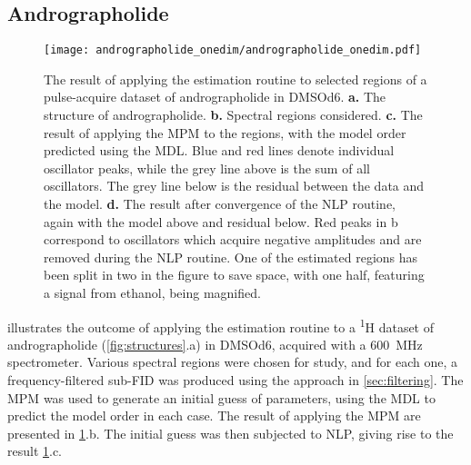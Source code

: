 \subsection{Andrographolide}
\label{subsec:andro}
\begin{figure}
    \centering
    \texttt{[image: andrographolide\_onedim/andrographolide\_onedim.pdf]}
    \caption[
        The result of applying the estimation routine to selected regions of a
        pulse-acquire dataset of andrographolide.
    ]{
        The result of applying the estimation routine to selected regions of a
        pulse-acquire dataset of andrographolide in \acs{DMSOd6}.
        \textbf{a.} The structure of andrographolide.
        \textbf{b.} Spectral regions considered.
        \textbf{c.} The result of applying the \acs{MPM} to the regions, with
        the model order predicted using the \acs{MDL}. Blue and red lines denote
        individual oscillator peaks, while the grey line above is the sum of all
        oscillators. The grey line below is the residual between the data and
        the model.
        \textbf{d.} The result after convergence of the \acs{NLP} routine, again
        with the model above and residual below.
        Red peaks in b correspond to oscillators which acquire negative
        amplitudes and are removed during the \acs{NLP} routine.
        One of the estimated regions has been split in two in the
        figure to save space, with one half, featuring a signal from ethanol,
        being magnified.
    }
    \label{fig:andro-onedim}
\end{figure}
 illustrates the outcome of applying the
estimation routine to a \textsuperscript{1}H dataset of
andrographolide (\cref{fig:structures}.a) in \acs{DMSOd6}, acquired with
a \qty{600}{\mega\hertz} spectrometer.
Various spectral regions were chosen for study, and for each one, a
frequency-filtered sub-\ac{FID} was produced using the approach in
\cref{sec:filtering}.
The \ac{MPM} was used to generate an initial guess of parameters, using the
\ac{MDL} to predict the model order in each case. The result of applying the
\ac{MPM} are presented in \cref{fig:andro-onedim}.b. The initial guess
was then subjected to \ac{NLP}, giving rise to the result
\cref{fig:andro-onedim}.c.


